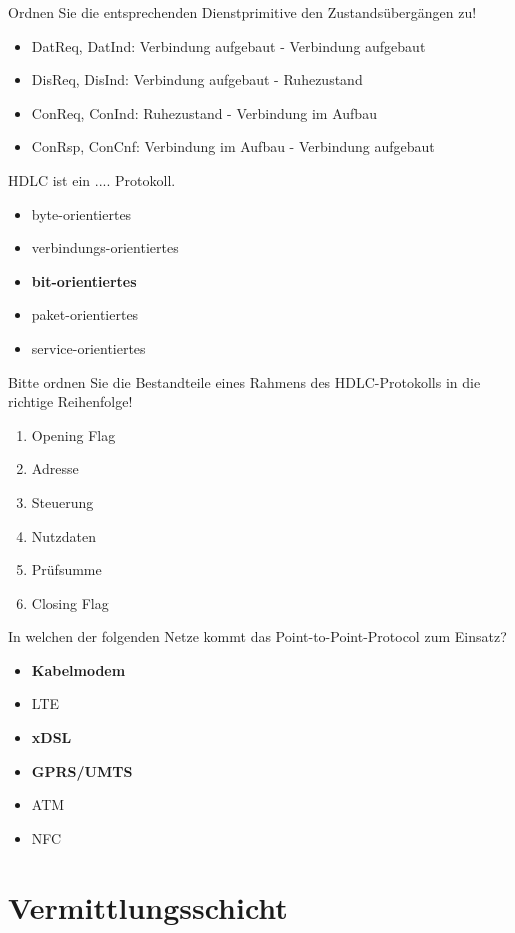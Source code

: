 \documentclass{article}
\begin{document}
	Ordnen Sie die entsprechenden Dienstprimitive den Zustandsübergängen zu!
	\begin{itemize}
		\item DatReq, DatInd: Verbindung aufgebaut - Verbindung aufgebaut
		\item DisReq, DisInd: Verbindung aufgebaut - Ruhezustand
		\item ConReq, ConInd: Ruhezustand - Verbindung im Aufbau 
		\item ConRsp, ConCnf: Verbindung im Aufbau - Verbindung aufgebaut 
	\end{itemize}

	HDLC ist ein .... Protokoll. 
	\begin{itemize}
		\item byte-orientiertes
		\item verbindungs-orientiertes
		\item \textbf{bit-orientiertes}
		\item paket-orientiertes 
		\item service-orientiertes
	\end{itemize}

	Bitte ordnen Sie die Bestandteile eines Rahmens des HDLC-Protokolls in die richtige Reihenfolge!
	\begin{enumerate}
		\item Opening Flag 
		\item Adresse 
		\item Steuerung
		\item Nutzdaten
		\item Prüfsumme
		\item Closing Flag
	\end{enumerate}

	In welchen der folgenden Netze kommt das Point-to-Point-Protocol zum Einsatz?
	\begin{itemize}
		\item \textbf{Kabelmodem}
		\item LTE
		\item \textbf{xDSL}
		\item \textbf{GPRS/UMTS}
		\item ATM
		\item NFC
	\end{itemize}
	
	\section{Vermittlungsschicht}
	
\end{document}
